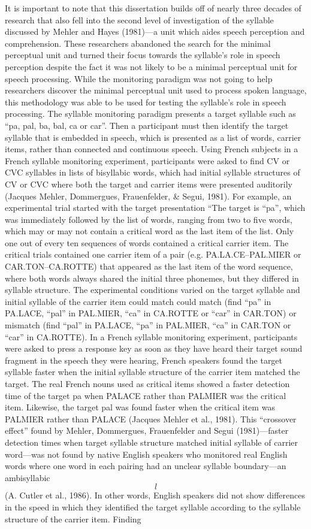 It is important to note that this dissertation builds off of nearly three decades of research that also fell into the second level of investigation of the syllable discussed by Mehler and Hayes (1981)—a unit which aides speech perception and comprehension. These researchers abandoned the search for the minimal perceptual unit and turned their focus towards the syllable’s role in speech perception despite the fact it was not likely to be a minimal perceptual unit for speech processing. While the monitoring paradigm was not going to help researchers discover the minimal perceptual unit used to process spoken language, this methodology was able to be used for testing the syllable’s role in speech processing. The syllable monitoring paradigm presents a target syllable such as “pa, pal, ba, bal, ca or car”. Then a participant must then identify the target syllable that is embedded in speech, which is presented as a list of words, carrier items, rather than connected and continuous speech. Using French subjects in a French syllable monitoring experiment, participants were asked to find CV or CVC syllables in lists of bisyllabic words, which had initial syllable structures of CV or CVC where both the target and carrier items were presented auditorily (Jacques Mehler, Dommergues, Frauenfelder, \& Segui, 1981). For example, an experimental trial started with the target presentation “The target is “pa”, which was immediately followed by the list of words, ranging from two to five words, which may or may not contain a critical word as the last item of the list. Only one out of every ten sequences of words contained a critical carrier item. The critical trials contained one carrier item of a pair (e.g. PA.LA.CE–PAL.MIER or CAR.TON–CA.ROTTE) that appeared as the last item of the word sequence, where both words always shared the initial three phonemes, but they differed in syllable structure. The experimental conditions varied on the target syllable and initial syllable of the carrier item could match could match (find “pa” in PA.LACE, “pal” in PAL.MIER, “ca” in CA.ROTTE or “car” in CAR.TON) or mismatch (find “pal” in PA.LACE, “pa” in PAL.MIER, “ca” in CAR.TON or “car” in CA.ROTTE).  In a French syllable monitoring experiment, participants were asked to press a response key as soon as they have heard their target sound fragment in the speech they were hearing, French speakers found the target syllable faster when the initial syllable structure of the carrier item matched the target. The real French nouns used as critical items showed a faster detection time of the target pa when PALACE rather than PALMIER was the critical item. Likewise, the target pal was found faster when the critical item was  PALMIER rather than PALACE (Jacques Mehler et al., 1981). This “crossover effect” found by Mehler, Dommergues, Frauenfelder and Segui (1981)—faster detection times when target syllable structure matched initial syllable of carrier word—was not found by native English speakers who monitored real English words where one word in each pairing had an unclear syllable boundary—an ambisyllabic \[l\] (A. Cutler et al., 1986). In other words, English speakers did not show differences in the speed in which they identified the target syllable according to the syllable structure of the carrier item. Finding 
